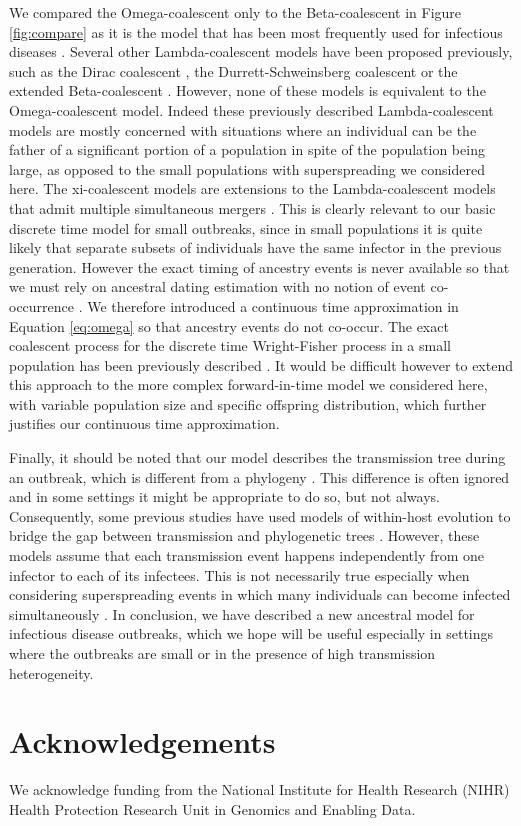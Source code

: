 \documentclass{article}
\renewcommand{\eqref}[1]{\ref{#1}}
\begin{document}
We compared the Omega-coalescent only to the Beta-coalescent \citep{schweinsbergCoalescentProcessesObtained2003} in Figure \ref{fig:compare}
as it is the model that has been most frequently used for infectious diseases
\citep{Hoscheit2019,Menardo2021,Helekal2024}.
Several other Lambda-coalescent models have been proposed previously, such as 
the Dirac coalescent \citep{eldonCoalescentProcessesWhen2006},
the Durrett-Schweinsberg coalescent \citep{Durrett2005a} or the
extended Beta-coalescent \citep{Helekal2024}. However, none of these models
is equivalent to the Omega-coalescent model. Indeed these previously
described Lambda-coalescent models are mostly
concerned with situations where an individual can be the father of a significant
portion of a population in spite of the population being large, as opposed to the 
small populations with superspreading we considered here.
The xi-coalescent models are extensions to the Lambda-coalescent models that admit multiple 
simultaneous mergers \citep{schweinsbergCoalescentsSimultaneousMultiple2000}.
This is clearly relevant to our basic discrete time model for small outbreaks,
since in small populations it is quite likely that separate subsets of individuals
have the same infector in the previous generation. 
However the exact timing of ancestry events is never available so that we
must rely on ancestral dating estimation with no notion of event
co-occurrence \citep{Volz2017,Didelot2018,Bouckaert2019,Helekal2024}. 
We therefore introduced a 
continuous time approximation in Equation \eqref{eq:omega} so that ancestry events 
do not co-occur.
The exact coalescent process for the discrete time Wright-Fisher process in a small 
population has been previously described \citep{fu_exact_2006}. 
It would be difficult however to extend this approach to the more complex
forward-in-time model we considered here, with variable population size and specific offspring
distribution, which further justifies our continuous time approximation. 

Finally, it should be noted that our model describes the transmission tree during
an outbreak, which is different from a phylogeny \citep{Jombart2011}. 
This difference is often ignored and in some settings it might be appropriate to do so,
but not always. Consequently, some
previous studies have used models of within-host evolution to bridge
the gap between transmission and phylogenetic trees
\citep{Didelot2014,Hall2015,Didelot2017}. However, these models assume
that each transmission event happens independently from one infector
to each of its infectees. This is not necessarily true especially when considering
superspreading events in which many individuals can become infected
simultaneously \citep{Riley2003,Wallinga2004,hoAccountingPotentialOverdispersion2023,Craddock2025}.
In conclusion, we have described a new ancestral model for infectious disease
outbreaks, which we hope will be useful especially in settings where 
the outbreaks are small or in the presence of high transmission heterogeneity.

\section*{Acknowledgements}

We acknowledge funding from the National Institute for Health Research (NIHR) Health Protection Research Unit in Genomics and Enabling Data.

\clearpage

%

\end{document}

